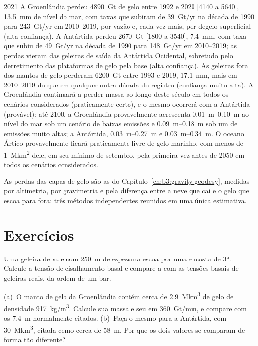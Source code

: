 \begin{dated}{2021}
A Groenlândia perdeu \qty{4890}{Gt} de gelo entre 1992 e 2020 [4140 a 5640],
\qty{13.5}{mm} de nível do mar, com taxas que subiram de \qty{39}{Gt/yr} na
década de 1990 para \qty{243}{Gt/yr} em 2010--2019, por vazão e, cada vez mais,
por degelo superficial (alta confiança). A Antártida perdeu \qty{2670}{Gt}
[1800 a 3540], \qty{7.4}{mm}, com taxa que subiu de \qty{49}{Gt/yr} na
década de 1990 para \qty{148}{Gt/yr} em 2010--2019; as perdas vieram das geleiras de saída da
Antártida Ocidental, sobretudo pelo derretimento das plataformas de gelo pela base (alta
confiança). As geleiras fora dos mantos de gelo perderam \qty{6200}{Gt}
entre 1993 e 2019, \qty{17.1}{mm}, mais em 2010--2019 do que em qualquer outra década
do registro (confiança muito alta). A Groenlândia continuará a perder massa
ao longo deste século em todos os cenários considerados (praticamente
certo), e o mesmo ocorrerá com a Antártida (provável): até 2100, a Groenlândia provavelmente acrescenta
\qtyrange{0.01}{0.10}{m} ao nível do mar sob um cenário de baixas emissões
e \qtyrange{0.09}{0.18}{m} sob um de emissões muito altas; a Antártida,
\qtyrange{0.03}{0.27}{m} e \qtyrange{0.03}{0.34}{m}. O oceano Ártico
provavelmente ficará praticamente livre de gelo marinho, com menos de
\qty{1}{\mega km^2} dele, em seu mínimo de setembro, pela primeira vez
antes de 2050 em todos os cenários considerados.
\end{dated}

As perdas das capas de gelo são as do Capítulo~\ref{ch:b3:gravity-geodesy},
medidas por altimetria, por gravimetria e pela diferença entre a neve
que cai e o gelo que escoa para fora: três métodos independentes reunidos
em uma única estimativa.

\section{Exercícios}

\begin{exercise}[$\star$]\label{exo:b3:glaciology:1}
Uma geleira de vale com \qty{250}{m} de espessura escoa por uma encosta de \ang{3}. Calcule
a tensão de cisalhamento basal e compare-a com as tensões basais de
geleiras reais, da ordem de um bar.
\end{exercise}

\begin{exercise}[$\star$]\label{exo:b3:glaciology:2}
(a)~O manto de gelo da Groenlândia contém cerca de \qty{2.9}{\mega km^3} de gelo de
densidade \qty{917}{kg/m^3}. Calcule sua massa e seu  em
\qty{360}{Gt/mm}, e compare com os \qty{7.4}{m} normalmente citados.
(b)~Faça o mesmo para a Antártida, com \qty{30}{\mega km^3}, citada como cerca de
\qty{58}{m}. Por que os dois valores se comparam de forma tão diferente?
\end{exercise}

